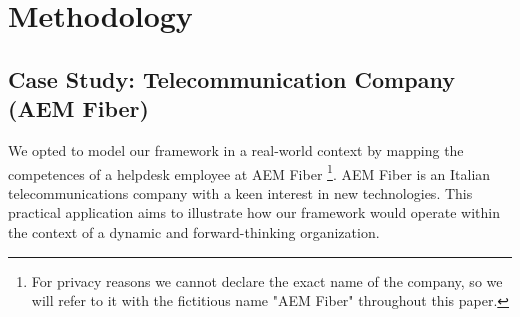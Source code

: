 \chapter{Methodology}

\section{Case Study: Telecommunication Company (AEM Fiber)}

We opted to model our framework in a real-world context by mapping the competences of a helpdesk employee at AEM Fiber \footnote{For privacy reasons we cannot declare the exact name of the company, so we will refer to it with the fictitious name "AEM Fiber" throughout this paper.}. AEM Fiber is an Italian telecommunications company with a keen interest in new technologies. This practical application aims to illustrate how our framework would operate within the context of a dynamic and forward-thinking organization.


